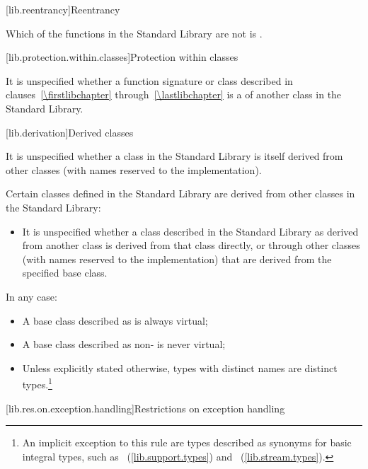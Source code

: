 [lib.reentrancy]{Reentrancy}

\pnum
Which of the functions in the \Cpp Standard Library are not
 is
.

[lib.protection.within.classes]{Protection within classes}

\pnum
{}%
It is unspecified whether a function signature or class described in
clauses~\ref{\firstlibchapter} through~\ref{\lastlibchapter} is a
of another class in the \Cpp Standard Library.

[lib.derivation]{Derived classes}

\pnum
{}%
%
It is unspecified whether a class in the \Cpp Standard Library is itself
derived from other classes (with names reserved to the implementation).

\pnum
Certain classes defined in the \Cpp Standard Library are derived from
other classes in the \Cpp Standard Library:

\begin{itemize}
%
\item It is unspecified whether a class described in the \Cpp Standard Library
as derived from another class is derived from that class directly, or through
other classes (with names reserved to the implementation) that are derived
from the specified base class.
\end{itemize}

\pnum
In any case:

\begin{itemize}
\item
A base class described as
is always virtual;
%
\item
A base class described as
non-
is never virtual;
%
\item
Unless explicitly stated otherwise, types with distinct names are distinct
types.\footnote{An implicit exception to this rule are types
described as synonyms for basic integral types, such as
~(\ref{lib.support.types}) and
~(\ref{lib.stream.types}).}
\end{itemize}

[lib.res.on.exception.handling]{Restrictions on exception handling}%
%

